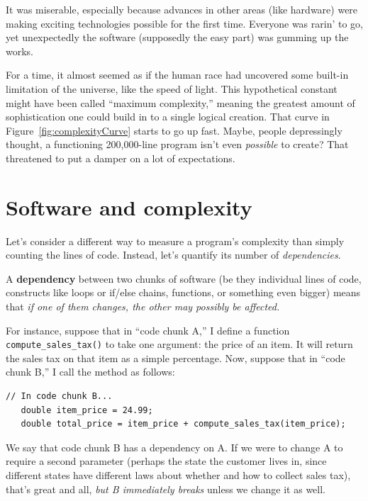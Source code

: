It was miserable, especially because advances in other areas (like hardware)
were making exciting technologies possible for the first time. Everyone was
rarin' to go, yet unexpectedly the software (supposedly the easy part) was
gumming up the works.

For a time, it almost seemed as if the human race had uncovered some built-in
limitation of the universe, like the speed of light. This hypothetical
constant might have been called ``maximum complexity,'' meaning the greatest
amount of sophistication one could build in to a single logical creation. That
curve in Figure~\ref{fig:complexityCurve} starts to go up fast. Maybe, people
depressingly thought, a functioning 200,000-line program isn't even
\textit{possible} to create? That threatened to put a damper on a lot of
expectations.

\section{Software and complexity}

Let's consider a different way to measure a program's complexity than simply
counting the lines of code. Instead, let's quantify its number of
\textit{dependencies}.

A \textbf{dependency} between two chunks of software (be they individual lines
of code, constructs like loops or if/else chains, functions, or something even
bigger) means that \textit{if one of them changes, the other may possibly be
affected.}

 For instance,
suppose that in ``code chunk A,'' I define a function
\texttt{compute\_sales\_tax()} to take one argument: the price of an item. It
will return the sales tax on that item as a simple percentage. Now, suppose
that in ``code chunk B,'' I call the method as follows:

\begin{Verbatim}[fontsize=\small,samepage=true,frame=single]
   // In code chunk B...
   double item_price = 24.99;
   double total_price = item_price + compute_sales_tax(item_price);
\end{Verbatim}

We say that code chunk B has a dependency on A. If we were to change A to
require a second parameter (perhaps the state the customer lives in, since
different states have different laws about whether and how to collect sales
tax), that's great and all, \textit{but B immediately breaks} unless we change
it as well.

